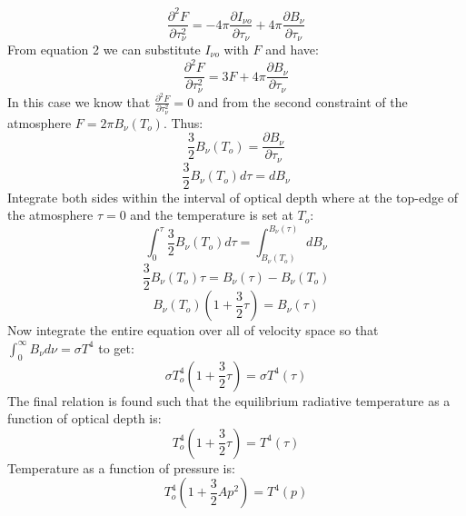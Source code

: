 \documentclass[11pt]{article}
\begin{document}
\[\frac{\partial^2 F}{\partial \tau_{\nu}^2}  = - 4 \pi \frac{\partial I_{\nu o}}{\partial \tau_{\nu}} +4\pi \frac{\partial B_{\nu }}{\partial \tau_{\nu}} \]
From equation 2 we can substitute \(I_{\nu o }\) with \(F\) and have:
\[\frac{\partial^2 F}{\partial \tau_{\nu}^2}  = 3F +4\pi \frac{\partial B_{\nu }}{\partial \tau_{\nu}} \]
In this case we know that
\(\frac{\partial^2 F}{\partial \tau_{\nu}^2} = 0\) and from the second
constraint of the atmosphere \(F = 2 \pi B_{\nu}(T_o)\). Thus:
\[\frac{3}{2} B_{\nu}(T_o) = \frac{\partial B_{\nu }}{\partial \tau_{\nu}}\]
\[\frac{3}{2} B_{\nu}(T_o) d \tau = d B_{\nu}\] Integrate both sides
within the interval of optical depth where at the top-edge of the
atmosphere \(\tau = 0\) and the temperature is set at \(T_o\):
\[\int_{0}^{\tau}\frac{3}{2} B_{\nu}(T_o) d \tau = \int_{B_{\nu}(T_o)}^{B_{\nu}(\tau)} d B_{\nu}\]
\[\frac{3}{2} B_{\nu}(T_o) \tau = B_{\nu}(\tau) - B_{\nu}(T_o)\]
\[ B_{\nu}(T_o)(1 + \frac{3}{2} \tau) = B_{\nu}(\tau)\] Now integrate
the entire equation over all of velocity space so that
\(\int_{0}^{\infty}B_{\nu}d\nu = \sigma T^4\) to get:
\[ \sigma T_o^4(1 + \frac{3}{2} \tau) = \sigma T^4(\tau)\] The final
relation is found such that the equilibrium radiative temperature as a
function of optical depth is:
\[ T_o^4(1 + \frac{3}{2} \tau) = T^4(\tau)\] Temperature as a function
of pressure is: \[ T_o^4(1 + \frac{3}{2} Ap^2) = T^4(p)\]
\end{document}
